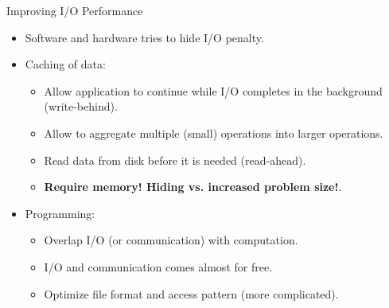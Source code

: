 \documentclass[compress,11pt,xcolor=svgnames,aspectratio=169]{beamer}
\begin{document}
\begin{frame}[fragile]{Improving I/O Performance}

\begin{itemize}
\setlength\itemsep{0.3cm}

\item Software and hardware tries to hide I/O penalty.

\item Caching of data:

  \begin{itemize}
  \setlength\itemsep{0.2cm}
    \item Allow application to continue while I/O completes in the background (write-behind).
    \item Allow to aggregate multiple (small) operations into larger operations.
    \item Read data from disk before it is needed (read-ahead).
    \item \textbf{Require memory! Hiding vs. increased problem size!}.
  \end{itemize}

\item Programming:

  \begin{itemize}
  \setlength\itemsep{0.2cm}
    \item Overlap I/O (or communication) with computation.
    \item I/O and communication comes almost for free.
    \item Optimize file format and access pattern (more complicated).
  \end{itemize}

\end{itemize}

\end{frame}
\end{document}
